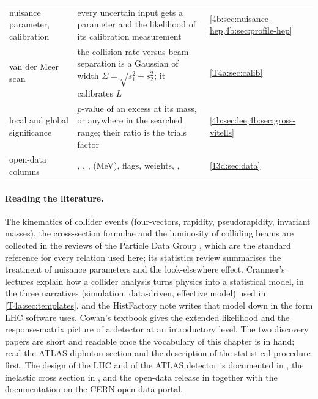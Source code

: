 \begin{small}
\begin{xltabular}{\linewidth}{>{\raggedright\arraybackslash}p{3.0cm} >{\raggedright\arraybackslash}X >{\raggedright\arraybackslash}p{3.4cm}}
nuisance parameter, calibration & every uncertain input gets a parameter and the likelihood of its calibration measurement & \cref{4b:sec:nuisance-hep,4b:sec:profile-hep} \\
van der Meer scan & the collision rate versus beam separation is a Gaussian of width $\Sigma=\sqrt{s_1^2+s_2^2}$; it calibrates $L$ & \cref{T4a:sec:calib} \\
local and global significance & $p$-value of an excess at its mass, or anywhere in the searched range; their ratio is the trials factor & \cref{4b:sec:lee,4b:sec:gross-vitells} \\
open-data columns & , , ,  (MeV), flags, weights, ,  & \cref{13d:sec:data} \\
\end{xltabular}
\end{small}

\paragraph{Reading the literature.}
The kinematics of collider events (four-vectors, rapidity, pseudorapidity, invariant masses), the cross-section formulae and the luminosity of colliding beams are collected in the reviews of the Particle Data Group \cite{PDG2024}, which are the standard reference for every relation used here; its statistics review summarises the treatment of nuisance parameters and the look-elsewhere effect. Cranmer's lectures \cite{Cranmer2015} explain how a collider analysis turns physics into a statistical model, in the three narratives (simulation, data-driven, effective model) used in \cref{T4a:sec:templates}, and the HistFactory note \cite{HistFactory2012} writes that model down in the form LHC software uses. Cowan's textbook  gives the extended likelihood and the response-matrix picture of a detector at an introductory level. The two discovery papers \cite{AadHiggs2012,ChatrchyanHiggs2012} are short and readable once the vocabulary of this chapter is in hand; read the ATLAS diphoton section and the description of the statistical procedure first. The design of the LHC and of the ATLAS detector is documented in \cite{LHCMachine2008,ATLASDetector2008}, the inelastic cross section in \cite{ATLASInelastic2016}, and the open-data release in \cite{ATLASOpenData2020,SerkinOpenData2020} together with the documentation on the CERN open-data portal.
  